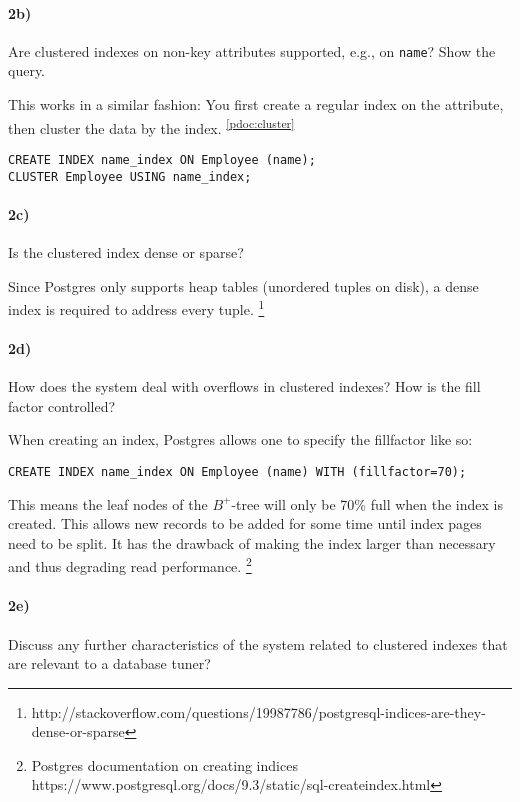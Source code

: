 \documentclass[11pt]{scrartcl}
\begin{document}
\paragraph{2b)} Are clustered indexes on non-key attributes supported, e.g.,
on {\tt name}?  Show the query.

\vspace{1em}
This works in a similar fashion: You first create a regular index
on the attribute, then cluster the data by the index. \textsuperscript{\ref{pdoc:cluster}}

{\small
\begin{verbatim}
CREATE INDEX name_index ON Employee (name);
CLUSTER Employee USING name_index;
\end{verbatim}
}

\paragraph{2c)} Is the clustered index dense or sparse?

\vspace{1em}
Since Postgres only supports heap
tables (unordered tuples on disk), a dense index is required to address
every tuple. \footnote{http://stackoverflow.com/questions/19987786/postgresql-indices-are-they-dense-or-sparse}

\paragraph{2d)} How does the system deal with overflows in clustered indexes?
How is the fill factor controlled?

\vspace{1em}
When creating an index, Postgres allows one to specify the fillfactor like so:

{\small
\begin{verbatim}
CREATE INDEX name_index ON Employee (name) WITH (fillfactor=70);
\end{verbatim}
}

This means the leaf nodes of the $B^+$-tree will only be 70\% full
when the index is created. This allows new records to be added for some time
until index pages need to be split. It has the drawback of making the index
larger than necessary and thus degrading read performance.
\footnote{Postgres documentation on creating indices https://www.postgresql.org/docs/9.3/static/sql-createindex.html}

\paragraph{2e)} Discuss any further characteristics of the system
related to clustered indexes that are relevant to a database
tuner?
\end{document}

